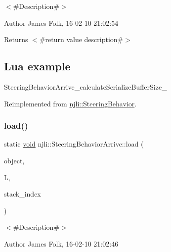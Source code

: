 $<$\#\+Description\#$>$ 

\begin{DoxyAuthor}{Author}
James Folk, 16-\/02-\/10 21\+:02\+:54
\end{DoxyAuthor}
\begin{DoxyReturn}{Returns}
$<$\#return value description\#$>$
\end{DoxyReturn}
\hypertarget{classnjli_1_1_steering_behavior_wander_ex1}{}\subsection{Lua example}\label{classnjli_1_1_steering_behavior_wander_ex1}

\begin{DoxyCodeInclude}
\end{DoxyCodeInclude}
Steering\+Behavior\+Arrive\+\_\+calculate\+Serialize\+Buffer\+Size\+\_\+ 

Reimplemented from \mbox{\hyperlink{classnjli_1_1_steering_behavior_ae82bca8468d41aff8c22b76fd359fe9b}{njli\+::\+Steering\+Behavior}}.

\mbox{\label{classnjli_1_1_steering_behavior_arrive_a38a4e9e532dd6f78619005a099f25ee5}} 
\subsubsection{\texorpdfstring{load()}{load()}}
{\footnotesize\ttfamily static \mbox{\hyperlink{_thread_8h_af1e856da2e658414cb2456cb6f7ebc66}{void}} njli\+::\+Steering\+Behavior\+Arrive\+::load (\begin{DoxyParamCaption}\item[{\mbox{\hyperlink{classnjli_1_1_steering_behavior_arrive}{Steering\+Behavior\+Arrive}} \&}]{object,  }\item[{lua\+\_\+\+State $\ast$}]{L,  }\item[{int}]{stack\+\_\+index }\end{DoxyParamCaption})\hspace{0.3cm}{\ttfamily [static]}}



$<$\#\+Description\#$>$ 

\begin{DoxyAuthor}{Author}
James Folk, 16-\/02-\/10 21\+:02\+:46
\end{DoxyAuthor}

